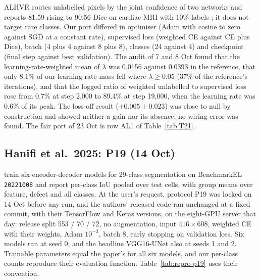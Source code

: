 ALHVR routes unlabelled pixels by the joint confidence of two networks and reports 81.59 rising to 90.56 Dice on cardiac MRI with
10\% labels \citep{lei2025alhvr}; it does not target rare classes. Our port differed in optimiser (Adam with cosine to zero against
SGD at a constant rate), supervised loss (weighted CE against CE plus Dice), batch (4 plus 4 against 8 plus 8), classes (24 against 4)
and checkpoint (final step against best validation). The audit of 7 and 8 Oct found that the learning-rate-weighted mean of $\lambda$ was
0.0156 against 0.0393 in the reference, that only 8.1\% of our learning-rate mass fell where $\lambda \geq 0.05$ (37\% of the
reference's iterations), and that the logged ratio of weighted unlabelled to supervised loss rose from 0.7\% at step 2,000 to 89.4\%
at step 19,000, when the learning rate was 0.6\% of its peak. The loss-off result ($+0.005 \pm 0.023$) was close to null by
construction and showed neither a gain nor its absence; no wiring error was found. The fair port of 23 Oct is row AL1 of
Table~\ref{tab:T21}.

\subsection{Hanifi et al.\ 2025: P19 (14 Oct)}\label{sec:repro-p19}

\citet{hanifi2025multiclass} train six encoder-decoder models for 29-class segmentation on BenchmarkEL \texttt{20221008} and report
per-class IoU pooled over test cells, with group means over feature, defect and all classes. At the user's request, protocol P19 was
locked on 14 Oct before any run, and the authors' released code ran unchanged at a fixed commit, with their TensorFlow and Keras
versions, on the eight-GPU server that day: release split 553 / 70 / 72, no augmentation, input $416 \times 608$, weighted CE with
their weights, Adam $10^{-3}$, batch 8, early stopping on validation loss. Six models ran at seed 0, and the headline VGG16-UNet also
at seeds 1 and 2. Trainable parameters equal the paper's for all six models, and our per-class counts reproduce their evaluation
function. Table~\ref{tab:repro-p19} uses their convention.

